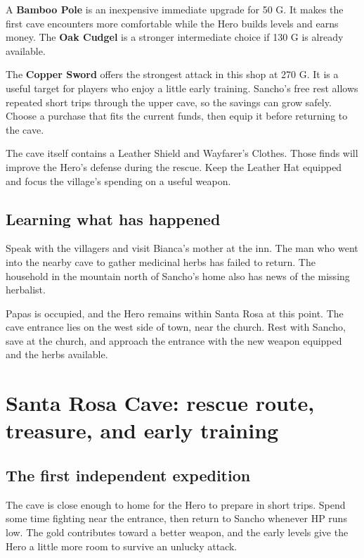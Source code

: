 A \textbf{Bamboo Pole} is an inexpensive immediate upgrade for 50 G.
It makes the first cave encounters more comfortable while the Hero builds
levels and earns money. The \textbf{Oak Cudgel} is a stronger intermediate
choice if 130 G is already available.

The \textbf{Copper Sword} offers the strongest attack in this shop at
270 G. It is a useful target for players who enjoy a little early training.
Sancho's free rest allows repeated short trips through the upper cave,
so the savings can grow safely. Choose a purchase that fits the current
funds, then equip it before returning to the cave.

The cave itself contains a Leather Shield and Wayfarer's Clothes.
Those finds will improve the Hero's defense during the rescue. Keep the
Leather Hat equipped and focus the village's spending on a useful weapon.

\subsection*{Learning what has happened}

Speak with the villagers and visit Bianca's mother at the inn. The man
who went into the nearby cave to gather medicinal herbs has failed to
return. The household in the mountain north of Sancho's home also has
news of the missing herbalist.

Papas is occupied, and the Hero remains within Santa Rosa at this point.
The cave entrance lies on the west side of town, near the church. Rest
with Sancho, save at the church, and approach the entrance with the new
weapon equipped and the herbs available.

\section{Santa Rosa Cave: rescue route, treasure, and early training}

\subsection*{The first independent expedition}

The cave is close enough to home for the Hero to prepare in short trips.
Spend some time fighting near the entrance, then return to Sancho whenever
HP runs low. The gold contributes toward a better weapon, and the early
levels give the Hero a little more room to survive an unlucky attack.

